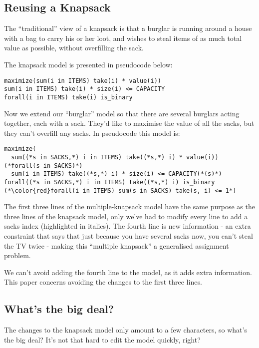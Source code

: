 \documentclass[a4paper,12pt]{article}
\begin{document}
\subsection{Reusing a Knapsack}

The ``traditional'' view of a knapsack is that a burglar is running around a house with a bag to carry his or her loot, and wishes to steal items of as much total value as possible, without overfilling the sack.

The knapsack model is presented in pseudocode below:

  \begin{lstlisting}[style=mosel]
maximize(sum(i in ITEMS) take(i) * value(i))
sum(i in ITEMS) take(i) * size(i) <= CAPACITY
forall(i in ITEMS) take(i) is_binary
  \end{lstlisting}

Now we extend our ``burglar'' model so that there are several burglars acting together,
each with a sack.  They'd like to maximise the value of all the sacks, but they can't overfill any sacks.  In pseudocode this model is:

  \begin{lstlisting}[style=mosel]
maximize(
  sum((*s in SACKS,*) i in ITEMS) take((*s,*) i) * value(i))
(*forall(s in SACKS)*)
  sum(i in ITEMS) take((*s,*) i) * size(i) <= CAPACITY(*(s)*)
forall((*s in SACKS,*) i in ITEMS) take((*s,*) i) is_binary
(*\color{red}forall(i in ITEMS) sum(s in SACKS) take(s, i) <= 1*)
\end{lstlisting}

The first three lines of the multiple-knapsack model have the same purpose as the three lines
of the knapsack model,
only we've had to modify every line to add a sacks index (highlighted in italics).
The fourth line is new information - an extra constraint that says that just because you have several sacks now, you can't steal the TV twice - making this ``multiple knapsack'' a generalised assignment problem.

We can't avoid adding the fourth line to the model, as it adds extra information.
This paper concerns avoiding the changes to the first three lines.


\subsection{What's the big deal?}
The changes to the knapsack model only amount to a few characters, so what's the big deal?
It's not that hard to edit the model quickly, right?
\end{document}
